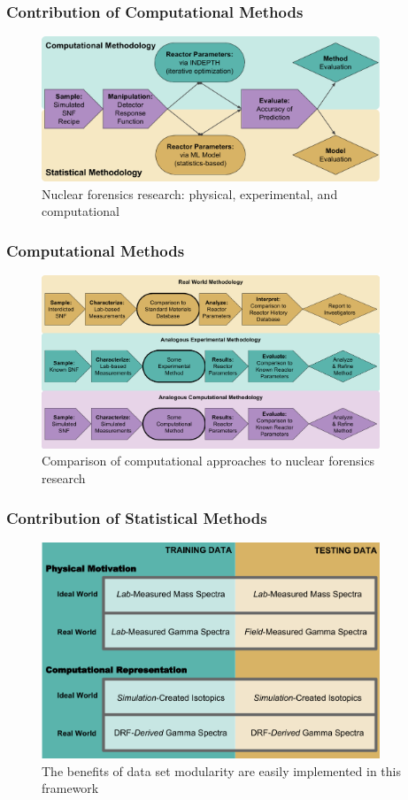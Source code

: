 
\begin{frame}
  \frametitle{Contribution of Computational Methods}
  \begin{figure}[h!]
    \centering
    \includegraphics[width=0.9\textwidth]{./figures/CompStatForensicsWorkflow.png}
    \caption{Nuclear forensics research: physical, experimental, and computational}
  \end{figure}
\end{frame}

\begin{frame}
  \frametitle{Computational Methods}
  \begin{figure}[h!]
    \centering
    \includegraphics[width=0.9\textwidth]{./figures/ForensicsWorkflows.png}
    \caption{Comparison of computational approaches to nuclear forensics research}
  \end{figure}
\end{frame}

\begin{frame}
  \frametitle{Contribution of Statistical Methods}
  \begin{figure}[h!]
    \centering
    \includegraphics[width=0.9\textwidth]{./figures/proposal.png}
    \caption{The benefits of data set modularity are easily implemented in this framework}
  \end{figure}
\end{frame}

